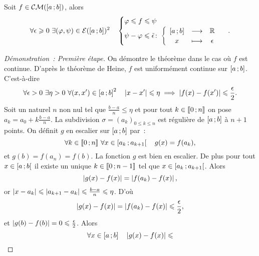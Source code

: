 \begin{theo}
  Soit \(f \in \mathcal{CM}(\left[ a \, ; {} b \right])\), alors
  \begin{equation}
    \forall \epsilon \geqslant 0 \ \exists (\varphi, \psi) \in 
    \mathcal{E}(\left[ a \, ; {} b \right])^2 \quad \begin{cases} \varphi \leqslant f \leqslant 
    \psi \\ \psi-\varphi \leqslant 
    \tilde{\epsilon}\colon\left\{\begin{array}{ccc}\left[ a \, ; {} b \right] & \longrightarrow &\mathbb{R}\\x & \longmapsto & \epsilon\end{array}\right. 
    \end{cases}.
  \end{equation}
\end{theo}
\begin{proof}[Démonstration~: Première étape]
  On démontre le théorème dans le cas où \(f\) est continue. D'après le théorème 
  de Heine, \(f\) est uniformément continue sur \(\left[ a \, ; {} b \right]\). 
  C'est-à-dire
  \begin{equation}
    \forall \epsilon >0 \ \exists \eta>0 \ \forall (x,x') \in 
    \intervalleff{a}{b}^2 \quad \abs{x-x'} \leqslant \eta \implies 
    \abs{f(x)-f(x')} \leqslant \frac{\epsilon}{2}.
  \end{equation}
  Soit un naturel \(n\) non nul tel que \(\frac{b-a}{n} \leqslant \eta\) et pour 
  tout \(k \in \mathopen{\llbracket}0\mathclose{}\mathpunct{};n\mathclose{\rrbracket}\) on pose \(a_k=a_0+k \frac{b-a}{n}\). La 
  subdivision \(\sigma=(a_k)_{0 \leqslant k \leqslant n}\) est régulière de 
  \(\left[ a \, ; {} b \right]\) à \(n+1\) points. On définit \(g\) en escalier sur 
  \(\left[ a \, ; {} b \right]\) par~:
  \begin{equation}
    \forall k \in \mathopen{\llbracket}0\mathclose{}\mathpunct{};n\mathclose{\rrbracket} \ \forall x \in 
    \left[ a_k \, ; {} a_{k+1} \right[ \quad g(x)=f(a_k),
  \end{equation}
  et \(g(b)=f(a_n)=f(b)\). La fonction \(g\) est bien en escalier. De plus pour 
  tout \(x \in \left[ a \, ; {} b \right[\) il existe un unique \(k \in 
  \mathopen{\llbracket}0\mathclose{}\mathpunct{};n-1\mathclose{\rrbracket}\) tel que \(x \in \left[ a_k \, ; {} a_{k+1} \right[\).  
  Alors
  \begin{equation}
    \left\lvert g(x)-f(x)\right\rvert = \left\lvert f(a_k)-f(x)\right\rvert,
  \end{equation}
  or \(\left\lvert x-a_k\right\rvert \leqslant \left\lvert a_{k+1}-a_k\right\rvert \leqslant \frac{b-a}{n}\leqslant 
  \eta\). D'où
  \begin{equation}
    \left\lvert g(x)-f(x)\right\rvert = \left\lvert f(a_k)-f(x)\right\rvert \leqslant \frac{\epsilon}{2},
  \end{equation}
  et \(\left\lvert g(b)-f(b)\right\rvert=0 \leqslant \frac{\epsilon}{2}\). Alors
  \begin{equation}
    \forall x \in \intervalleff{a}{b} \quad \abs{g(x)-f(x)} \leqslant 

\end{equation}
\end{proof}
